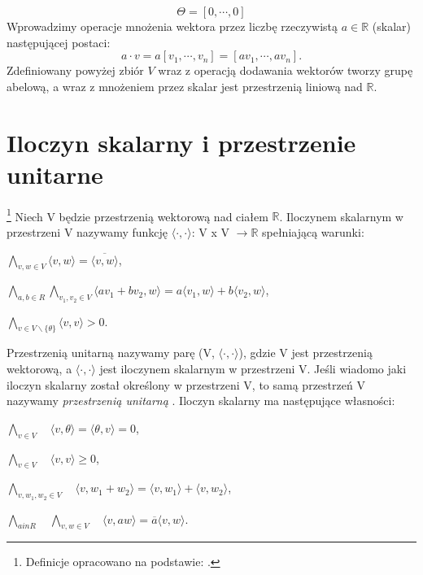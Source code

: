 \begin{equation*}
    \Theta = [0,\cdots,0]
\end{equation*}
Wprowadzimy operacje mnożenia wektora przez liczbę rzeczywistą $a \in \mathbb{R}$ (skalar) następującej postaci:
\begin{equation*}
a \cdot v = a[v_{1}, \cdots, v_{n}] = [av_{1},\cdots, av_{n}].
\end{equation*}
Zdefiniowany powyżej zbiór $V$ wraz z operacją dodawania wektorów tworzy grupę abelową, a wraz z mnożeniem przez skalar jest przestrzenią liniową nad $\mathbb{R}$.

\section{Iloczyn skalarny i przestrzenie unitarne}

\begin{definicja}\footnote{Definicje opracowano na podstawie: \citep[s. 198]{Rutkowski_2008}.}
Niech V będzie przestrzenią wektorową nad ciałem $\mathbb{R}$. Iloczynem skalarnym w przestrzeni V nazywamy funkcję $\big \langle \cdot, \cdot \big \rangle$: V x V $\rightarrow \mathbb{R}$ spełniającą warunki:
\\
\begin{axioms}
    \item $\bigwedge_{v,w \in V} \big \langle v, w \big \rangle = \overline{\big \langle v, w \big \rangle}$,
    
    \item $\bigwedge_{a,b \in R} \bigwedge_{v_{1},v_{2} \in V} \big \langle av_{1} + bv_{2}, w \big \rangle = a \big \langle v_{1}, w \big \rangle + b \big \langle v_{2}, w \big \rangle$,
    \item $\bigwedge_{v \in V \backslash \{\theta\}} \big \langle v, v \big \rangle > 0$. 
\end{axioms}
\end{definicja}

Przestrzenią unitarną nazywamy parę (V, $\big \langle \cdot, \cdot \big \rangle$), gdzie V jest przestrzenią wektorową, a $\big \langle \cdot, \cdot \big \rangle$ jest iloczynem skalarnym w przestrzeni V.
Jeśli wiadomo jaki iloczyn skalarny został określony w przestrzeni V, to samą przestrzeń V nazywamy \textit{przestrzenią unitarną} \citep[s. 198-199]{Rutkowski_2008}.
\newline
Iloczyn skalarny ma następujące własności:
\begin{axioms}
\item $\bigwedge_{v \in V} \quad \big \langle v, \theta \big \rangle =  \big \langle \theta, v \big \rangle = 0$,

\item $\bigwedge_{v \in V} \quad \big \langle v, v \big \rangle \geq 0$,
\item $\bigwedge_{v,w_{1},w_{2} \in V} \quad \big \langle v, w_{1} + w_{2} \big \rangle =  \big \langle v, w_{1} \big \rangle + \big \langle v, w_{2} \big \rangle$,
\item $\bigwedge_{a in R} \quad \bigwedge_{v, w \in V} \quad \big \langle v, aw \big \rangle = \overline{a} \big \langle v, w \big \rangle$.

\end{axioms}

